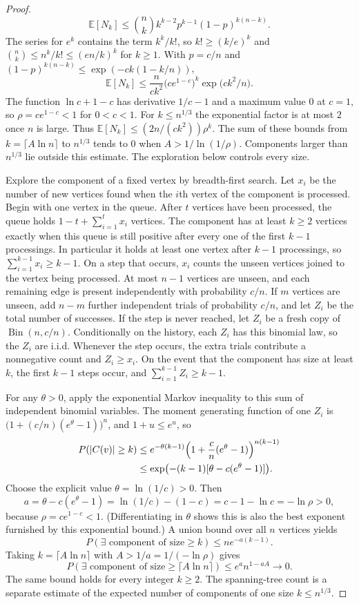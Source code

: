 \begin{proof}
\[
 \mathbb E[N_k]\le\binom{n}{k}k^{k-2}p^{k-1}(1-p)^{k(n-k)}.
\]
The series for $e^k$ contains the term $k^k/k!$, so $k!\ge(k/e)^k$ and $\binom{n}{k}\le n^k/k!\le(en/k)^k$ for $k\ge1$. With $p=c/n$ and $(1-p)^{k(n-k)}\le\exp(-ck(1-k/n))$,
\[
 \mathbb E[N_k]\le\frac{n}{ck^2}\bigl(ce^{1-c}\bigr)^k\exp\bigl(ck^2/n\bigr).
\]
The function $\ln c+1-c$ has derivative $1/c-1$ and a maximum value $0$ at $c=1$, so $\rho=ce^{1-c}<1$ for $0<c<1$. For $k\le n^{1/3}$ the exponential factor is at most $2$ once $n$ is large. Thus $\mathbb E[N_k]\le(2n/(ck^2))\rho^k$. The sum of these bounds from $k=\lceil A\ln n\rceil$ to $n^{1/3}$ tends to $0$ when $A>1/\ln(1/\rho)$. Components larger than $n^{1/3}$ lie outside this estimate. The exploration below controls every size.

Explore the component of a fixed vertex by breadth-first search. Let $x_i$ be the number of new vertices found when the $i$th vertex of the component is processed. Begin with one vertex in the queue. After $t$ vertices have been processed, the queue holds $1-t+\sum_{i=1}^t x_i$ vertices. The component has at least $k\ge2$ vertices exactly when this queue is still positive after every one of the first $k-1$ processings. In particular it holds at least one vertex after $k-1$ processings, so $\sum_{i=1}^{k-1}x_i\ge k-1$. On a step that occurs, $x_i$ counts the unseen vertices joined to the vertex being processed. At most $n-1$ vertices are unseen, and each remaining edge is present independently with probability $c/n$. If $m$ vertices are unseen, add $n-m$ further independent trials of probability $c/n$, and let $Z_i$ be the total number of successes. If the step is never reached, let $Z_i$ be a fresh copy of $\operatorname{Bin}(n,c/n)$. Conditionally on the history, each $Z_i$ has this binomial law, so the $Z_i$ are i.i.d. Whenever the step occurs, the extra trials contribute a nonnegative count and $Z_i\ge x_i$. On the event that the component has size at least $k$, the first $k-1$ steps occur, and $\sum_{i=1}^{k-1}Z_i\ge k-1$.

For any $\theta>0$, apply the exponential Markov inequality to this sum of independent binomial variables. The moment generating function of one $Z_i$ is $\bigl(1+(c/n)(e^\theta-1)\bigr)^n$, and $1+u\le e^u$, so
\[
\begin{aligned}
P(|C(v)|\ge k)&\le e^{-\theta(k-1)}\Bigl(1+\frac cn(e^\theta-1)\Bigr)^{n(k-1)}\\
&\le\exp\bigl(-(k-1)[\theta-c(e^\theta-1)]\bigr).
\end{aligned}
\]
Choose the explicit value $\theta=\ln(1/c)>0$. Then
\[
 a=\theta-c(e^\theta-1)=\ln(1/c)-(1-c)=c-1-\ln c=-\ln\rho>0,
\]
because $\rho=ce^{1-c}<1$. (Differentiating in $\theta$ shows this is also the best exponent furnished by this exponential bound.) A union bound over all $n$ vertices yields
\[
P(\exists\text{ component of size}\ge k)\le n e^{-a(k-1)}.
\]
Taking $k=\lceil A\ln n\rceil$ with $A>1/a=1/(-\ln\rho)$ gives
\[
 P(\exists\text{ component of size}\ge \lceil A\ln n\rceil)
 \le e^a n^{1-aA}\longrightarrow0.
\]
The same bound holds for every integer $k\ge2$. The spanning-tree count is a separate estimate of the expected number of components of one size $k\le n^{1/3}$.
\end{proof}


